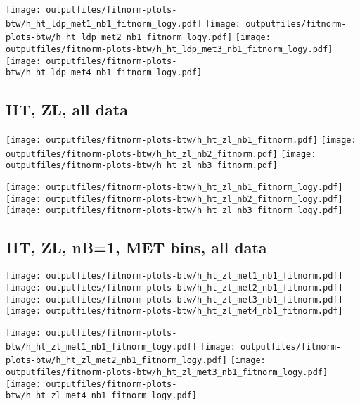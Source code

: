 \documentclass[11pt]{article}
\begin{document}
    \noindent
     \texttt{[image: outputfiles/fitnorm-plots-btw/h\_ht\_ldp\_met1\_nb1\_fitnorm\_logy.pdf]}
     \texttt{[image: outputfiles/fitnorm-plots-btw/h\_ht\_ldp\_met2\_nb1\_fitnorm\_logy.pdf]}
     \texttt{[image: outputfiles/fitnorm-plots-btw/h\_ht\_ldp\_met3\_nb1\_fitnorm\_logy.pdf]}
     \texttt{[image: outputfiles/fitnorm-plots-btw/h\_ht\_ldp\_met4\_nb1\_fitnorm\_logy.pdf]}

   \clearpage

     \subsection{ HT, ZL, all data}

    \noindent
     \texttt{[image: outputfiles/fitnorm-plots-btw/h\_ht\_zl\_nb1\_fitnorm.pdf]}
     \texttt{[image: outputfiles/fitnorm-plots-btw/h\_ht\_zl\_nb2\_fitnorm.pdf]}
     \texttt{[image: outputfiles/fitnorm-plots-btw/h\_ht\_zl\_nb3\_fitnorm.pdf]}

    \noindent
     \texttt{[image: outputfiles/fitnorm-plots-btw/h\_ht\_zl\_nb1\_fitnorm\_logy.pdf]}
     \texttt{[image: outputfiles/fitnorm-plots-btw/h\_ht\_zl\_nb2\_fitnorm\_logy.pdf]}
     \texttt{[image: outputfiles/fitnorm-plots-btw/h\_ht\_zl\_nb3\_fitnorm\_logy.pdf]}


   \clearpage

     \subsection{ HT, ZL, nB=1, MET bins, all data}

    \noindent
     \texttt{[image: outputfiles/fitnorm-plots-btw/h\_ht\_zl\_met1\_nb1\_fitnorm.pdf]}
     \texttt{[image: outputfiles/fitnorm-plots-btw/h\_ht\_zl\_met2\_nb1\_fitnorm.pdf]}
     \texttt{[image: outputfiles/fitnorm-plots-btw/h\_ht\_zl\_met3\_nb1\_fitnorm.pdf]}
     \texttt{[image: outputfiles/fitnorm-plots-btw/h\_ht\_zl\_met4\_nb1\_fitnorm.pdf]}

    \noindent
     \texttt{[image: outputfiles/fitnorm-plots-btw/h\_ht\_zl\_met1\_nb1\_fitnorm\_logy.pdf]}
     \texttt{[image: outputfiles/fitnorm-plots-btw/h\_ht\_zl\_met2\_nb1\_fitnorm\_logy.pdf]}
     \texttt{[image: outputfiles/fitnorm-plots-btw/h\_ht\_zl\_met3\_nb1\_fitnorm\_logy.pdf]}
     \texttt{[image: outputfiles/fitnorm-plots-btw/h\_ht\_zl\_met4\_nb1\_fitnorm\_logy.pdf]}
\end{document}
